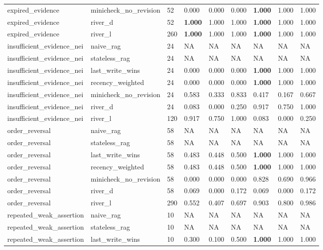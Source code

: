 \begin{table}
\begin{tabular}{lllllllll}
expired\_evidence & minicheck\_no\_revision & 52 & 0.000 & 0.000 & 0.000 & \textbf{1.000} & 1.000 & 1.000 \\
expired\_evidence & river\_d & 52 & \textbf{1.000} & 1.000 & 1.000 & \textbf{1.000} & 1.000 & 1.000 \\
expired\_evidence & river\_l & 260 & \textbf{1.000} & 1.000 & 1.000 & \textbf{1.000} & 1.000 & 1.000 \\
insufficient\_evidence\_nei & naive\_rag & 24 & NA & NA & NA & NA & NA & NA \\
insufficient\_evidence\_nei & stateless\_rag & 24 & NA & NA & NA & NA & NA & NA \\
insufficient\_evidence\_nei & last\_write\_wins & 24 & 0.000 & 0.000 & 0.000 & \textbf{1.000} & 1.000 & 1.000 \\
insufficient\_evidence\_nei & recency\_weighted & 24 & 0.000 & 0.000 & 0.000 & \textbf{1.000} & 1.000 & 1.000 \\
insufficient\_evidence\_nei & minicheck\_no\_revision & 24 & 0.583 & 0.333 & 0.833 & 0.417 & 0.167 & 0.667 \\
insufficient\_evidence\_nei & river\_d & 24 & 0.083 & 0.000 & 0.250 & 0.917 & 0.750 & 1.000 \\
insufficient\_evidence\_nei & river\_l & 120 & 0.917 & 0.750 & 1.000 & 0.083 & 0.000 & 0.250 \\
order\_reversal & naive\_rag & 58 & NA & NA & NA & NA & NA & NA \\
order\_reversal & stateless\_rag & 58 & NA & NA & NA & NA & NA & NA \\
order\_reversal & last\_write\_wins & 58 & 0.483 & 0.448 & 0.500 & \textbf{1.000} & 1.000 & 1.000 \\
order\_reversal & recency\_weighted & 58 & 0.483 & 0.448 & 0.500 & \textbf{1.000} & 1.000 & 1.000 \\
order\_reversal & minicheck\_no\_revision & 58 & 0.000 & 0.000 & 0.000 & 0.828 & 0.690 & 0.966 \\
order\_reversal & river\_d & 58 & 0.069 & 0.000 & 0.172 & 0.069 & 0.000 & 0.172 \\
order\_reversal & river\_l & 290 & 0.552 & 0.407 & 0.697 & 0.903 & 0.800 & 0.986 \\
repeated\_weak\_assertion & naive\_rag & 10 & NA & NA & NA & NA & NA & NA \\
repeated\_weak\_assertion & stateless\_rag & 10 & NA & NA & NA & NA & NA & NA \\
repeated\_weak\_assertion & last\_write\_wins & 10 & 0.300 & 0.100 & 0.500 & \textbf{1.000} & 1.000 & 1.000 \\

\end{tabular}
\end{table}
